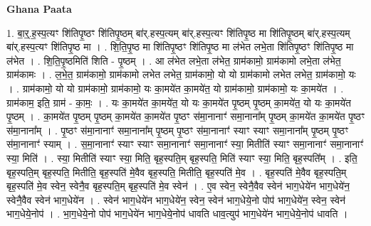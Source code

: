 \documentclass[17pt]{extarticle}
\begin{document}
\textbf{Ghana Paata } \newline

1. बा॒र्॒.ह॒स्प॒त्यꣳ शि॑तिपृ॒ष्ठꣳ शि॑तिपृ॒ष्ठम् बा॑र्.हस्प॒त्यम् बा॑र्.हस्प॒त्यꣳ शि॑तिपृ॒ष्ठ मा शि॑तिपृ॒ष्ठम् बा॑र्.हस्प॒त्यम् बा॑र्.हस्प॒त्यꣳ शि॑तिपृ॒ष्ठ मा । . शि॒ति॒पृ॒ष्ठ मा शि॑तिपृ॒ष्ठꣳ शि॑तिपृ॒ष्ठ मा ल॑भेत लभे॒ता शि॑तिपृ॒ष्ठꣳ शि॑तिपृ॒ष्ठ मा ल॑भेत । . शि॒ति॒पृ॒ष्ठमिति॑ शिति - पृ॒ष्ठम् । . आ ल॑भेत लभे॒ता ल॑भेत॒ ग्राम॑कामो॒ ग्राम॑कामो लभे॒ता ल॑भेत॒ ग्राम॑कामः । . ल॒भे॒त॒ ग्राम॑कामो॒ ग्राम॑कामो लभेत लभेत॒ ग्राम॑कामो॒ यो यो ग्राम॑कामो लभेत लभेत॒ ग्राम॑कामो॒ यः । . ग्राम॑कामो॒ यो यो ग्राम॑कामो॒ ग्राम॑कामो॒ यः का॒मये॑त का॒मये॑त॒ यो ग्राम॑कामो॒ ग्राम॑कामो॒ यः का॒मये॑त । . ग्राम॑काम॒ इति॒ ग्राम॑ - का॒मः॒ । . यः का॒मये॑त का॒मये॑त॒ यो यः का॒मये॑त पृ॒ष्ठम् पृ॒ष्ठम् का॒मये॑त॒ यो यः का॒मये॑त पृ॒ष्ठम् । . का॒मये॑त पृ॒ष्ठम् पृ॒ष्ठम् का॒मये॑त का॒मये॑त पृ॒ष्ठꣳ स॑मा॒नानाꣳ॑ समा॒नाना᳚म् पृ॒ष्ठम् का॒मये॑त का॒मये॑त पृ॒ष्ठꣳ स॑मा॒नाना᳚म् । . पृ॒ष्ठꣳ स॑मा॒नानाꣳ॑ समा॒नाना᳚म् पृ॒ष्ठम् पृ॒ष्ठꣳ स॑मा॒नानाꣳ॑ स्याꣳ स्याꣳ समा॒नाना᳚म् पृ॒ष्ठम् पृ॒ष्ठꣳ स॑मा॒नानाꣳ॑ स्याम् । . स॒मा॒नानाꣳ॑ स्याꣳ स्याꣳ समा॒नानाꣳ॑ समा॒नानाꣳ॑ स्या॒ मितीति॑ स्याꣳ समा॒नानाꣳ॑ समा॒नानाꣳ॑ स्या॒ मिति॑ । . स्या॒ मितीति॑ स्याꣳ स्या॒ मिति॒ बृह॒स्पति॒म् बृह॒स्पति॒ मिति॑ स्याꣳ स्या॒ मिति॒ बृह॒स्पति᳚म् । . इति॒ बृह॒स्पति॒म् बृह॒स्पति॒ मितीति॒ बृह॒स्पति॑ मे॒वैव बृह॒स्पति॒ मितीति॒ बृह॒स्पति॑ मे॒व । . बृह॒स्पति॑ मे॒वैव बृह॒स्पति॒म् बृह॒स्पति॑ मे॒व स्वेन॒ स्वेनै॒व बृह॒स्पति॒म् बृह॒स्पति॑ मे॒व स्वेन॑ । . ए॒व स्वेन॒ स्वेनै॒वैव स्वेन॑ भाग॒धेये॑न भाग॒धेये॑न॒ स्वेनै॒वैव स्वेन॑ भाग॒धेये॑न । . स्वेन॑ भाग॒धेये॑न भाग॒धेये॑न॒ स्वेन॒ स्वेन॑ भाग॒धेये॒नो पोप॑ भाग॒धेये॑न॒ स्वेन॒ स्वेन॑ भाग॒धेये॒नोप॑ । . भा॒ग॒धेये॒नो पोप॑ भाग॒धेये॑न भाग॒धेये॒नोप॑ धावति धाव॒त्युप॑ भाग॒धेये॑न भाग॒धेये॒नोप॑ धावति । \newline
\end{document}
